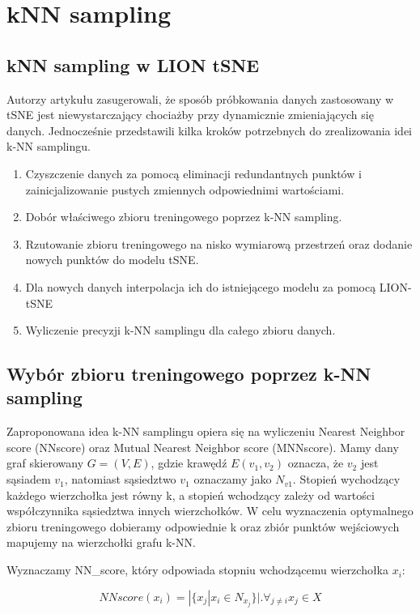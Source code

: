 \documentclass{article}
\begin{document}
\section{kNN sampling}
\label{sec:kNN}

\subsection{kNN sampling w LION tSNE}

Autorzy artykułu zasugerowali, że sposób próbkowania danych zastosowany w tSNE jest niewystarczający chociażby przy dynamicznie zmieniających się danych. Jednocześnie przedstawili kilka kroków potrzebnych do zrealizowania idei k-NN samplingu.
\begin{enumerate}
    \item Czyszczenie danych za pomocą eliminacji redundantnych punktów i zainicjalizowanie pustych zmiennych odpowiednimi wartościami.
    \item Dobór właściwego zbioru treningowego poprzez k-NN sampling.
    \item Rzutowanie zbioru treningowego na nisko wymiarową przestrzeń oraz dodanie nowych punktów do modelu tSNE.
    \item Dla nowych danych interpolacja ich do istniejącego modelu za pomocą LION-tSNE
    \item Wyliczenie precyzji k-NN samplingu dla całego zbioru danych.

\end{enumerate}

\subsection{Wybór zbioru treningowego poprzez k-NN sampling}

Zaproponowana idea k-NN samplingu opiera się na wyliczeniu Nearest Neighbor score (NNscore)
oraz Mutual Nearest Neighbor score (MNNscore). Mamy dany graf skierowany $G=(V, E)$, gdzie 
krawędź $E(v_1, v_2)$ oznacza, że $v_2$ jest sąsiadem $v_1$, natomiast sąsiedztwo $v_1$ oznaczamy jako $N_{v1}$. Stopień wychodzący każdego wierzchołka jest równy k, a stopień wchodzący zależy od wartości współczynnika sąsiedztwa innych wierzchołków. W celu wyznaczenia optymalnego zbioru treningowego dobieramy odpowiednie k oraz zbiór punktów wejściowych mapujemy na wierzchołki grafu k-NN.

Wyznaczamy NN\_score, który odpowiada stopniu wchodzącemu wierzchołka $x_i$:

\[NNscore(x_i) = | \{x_j | x_i \in N_{x_{j}} \} |. \forall_{j \neq i}x_j \in X \]
\end{document}
